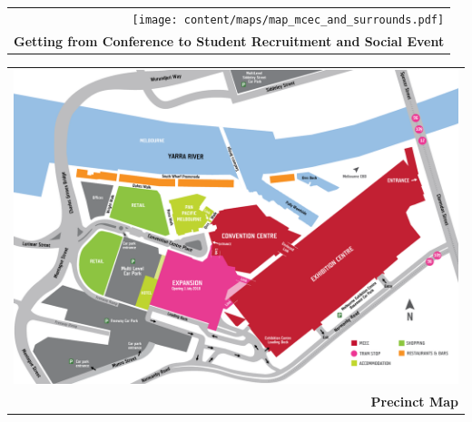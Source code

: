 
\cleardoublepageEVEN




\begin{center}
  \begin{tabular}{r}
    \texttt{[image: content/maps/map\_mcec\_and\_surrounds.pdf]}
    \\[3em]
    {\large \textbf{Getting from Conference to Student Recruitment and Social Event}}
  \end{tabular}
  \label{page:surrounds-map}
\end{center}


\begin{center}
    \begin{tabular}{r}
    \includegraphics[angle=90,width=\textwidth]{content/maps/mcec_precinct.pdf}
    \\[3em]
    {\Large \textbf{Precinct Map}}
    \end{tabular}
\end{center}

